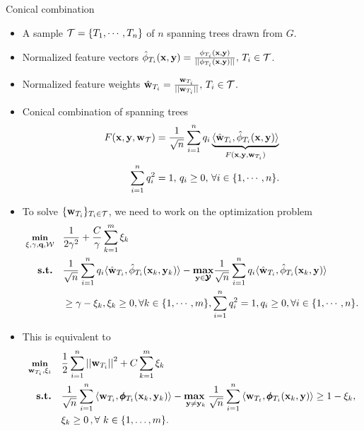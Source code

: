 \documentclass[first=dgreen,second=purple,logo=yellowexc]{aaltoslides}
\begin{document}
%
\begin{frame}[allowframebreaks]{Conical combination}
	\begin{itemize}\footnotesize
		\item A sample $\mathcal{T}=\{T_1,\cdots,T_n\}$ of $n$ spanning trees drawn from $G$.
		\item Normalized feature vectors $\hat{\phi}_{T_i}(\mathbf {x},\mathbf {y})=\frac{\phi_{T_i}(\mathbf {x},\mathbf {y})}{||\phi_{T_i}(\mathbf {x},\mathbf {y})||}, \, T_i\in\mathcal{T}$.
		\item Normalized feature weights $\hat{\mathbf {w}}_{T_i}=\frac{\mathbf {w}_{T_i}}{||\mathbf {w}_{T_i}||}, \, T_i\in\mathcal{T}$.
		\item Conical combination of spanning trees
		\begin{align*}\footnotesize
			F(\mathbf {x},\mathbf {y},\mathbf {w}_{\mathcal{T}}) &= \frac{1}{\sqrt{n}}\sum_{i=1}^{n}q_i\underbrace{\langle \hat{\mathbf {w}}_{T_i}, \hat{\phi}_{T_i}(\mathbf {x},\mathbf {y}) \rangle}_{F(\mathbf {x},\mathbf {y},\mathbf {w}_{T_i})}\\
			\sum_{i=1}^{n}q_i^2 &= 1,\, q_i \ge 0,\, \forall i\in\{1,\cdots,n\}.
		\end{align*}
		\item To solve $\{\mathbf {w}_{T_i}\}_{T_i\in\mathcal{T}}$, we need to work on the optimization problem
		\begin{align*}\footnotesize
			\underset{\mathbf{\xi},\gamma,\mathbf {q},\mathcal{W}}{\textbf{min}} \quad& \frac{1}{2\gamma^2} + \frac{C}{\gamma}\sum_{k=1}^m\xi_k\\
			\textbf{s.t.} \quad& \frac{1}{\sqrt{n}}\sum_{i=1}^{n}q_i\langle \hat{\mathbf {w}}_{T_i}, \hat{\phi}_{T_i}(\mathbf {x}_k,\mathbf {y}_k) \rangle -\underset{\mathbf {y}\in\pmb {\mathcal{Y}}}{\textbf{max}}\frac{1}{\sqrt{n}}\sum_{i=1}^{n}q_i\langle \hat{\mathbf {w}}_{T_i}, \hat{\phi}_{T_i}(\mathbf {x}_k,\mathbf {y}) \rangle\\
			&\ge \gamma-\xi_k, \xi_k\ge 0,\forall k\in\{1,\cdots,m\},\sum_{i=1}^nq_i^2=1,q_i\ge0,\forall i\in\{1,\cdots,n\}.
		\end{align*}
		\item This is equivalent to
		\begin{align*}\footnotesize
			\underset{\mathbf {w}_{T_i},\xi_i}{\textbf{min}} & \quad \frac{1}{2}\sum_{i=1}^{n}\left|\left| \mathbf {w}_{T_i} \right|\right|^2 + C\sum_{k=1}^{m}\xi_k\\
			\textbf{s.t.} & \quad \frac{1}{\sqrt{n}}\sum_{i=1}^{n}{ \langle \mathbf {w}_{T_i}, \pmb \phi_{T_t}(\mathbf {x}_k,\mathbf {y}_k) \rangle} - \underset{\mathbf {y} \neq \mathbf {y}_k}{\textbf{max}\ } \frac{1}{\sqrt{n}}\sum_{i=1}^{n}{\langle \mathbf {w}_{T_t}, \pmb \phi_{T_i}(\mathbf {x}_k,\mathbf {y}) \rangle } \geq 1 -  \xi_k, \\
			& \quad \xi_k\ge0\, , \forall\ k \in \{ 1,\dots,m \}.
		\end{align*}
	\end{itemize}
\end{frame}
\end{document}

